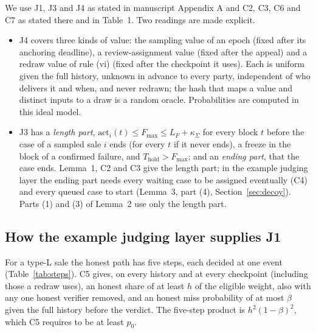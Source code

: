 \documentclass[10pt,a4paper]{article}
\newcommand{\Thold}{T_{\mathrm{hold}}}
\newcommand{\Fmax}{F_{\max}}
\newcommand{\kS}{\kappa_{\Sigma}}
\theoremstyle{plain}
\theoremstyle{remark}
\begin{document}
We use J1, J3 and J4 as stated in manuscript Appendix A and C2, C3, C6 and C7 as stated there and in Table~1. Two readings are made explicit.
\begin{itemize}
\item J4 covers three kinds of value: the sampling value of an epoch (fixed after its anchoring deadline), a review-assignment value (fixed after the appeal) and a redraw value of rule (vi) (fixed after the checkpoint it uses). Each is uniform given the full history, unknown in advance to every party, independent of who delivers it and when, and never redrawn; the hash that maps a value and distinct inputs to a draw is a random oracle. Probabilities are computed in this ideal model.
\item J3 has a \emph{length part}, $\mathrm{act}_i(t)\le\Fmax\le L_F+\kS$ for every block $t$ before the case of a sampled sale $i$ ends (for every $t$ if it never ends), a freeze in the block of a confirmed failure, and $\Thold>\Fmax$; and an \emph{ending part}, that the case ends. Lemma~1, C2 and C3 give the length part; in the example judging layer the ending part needs every waiting case to be assigned eventually (C4) and every queued case to start (Lemma~3, part (4), Section~\ref{sec:decoy}). Parts (1) and (3) of Lemma~2 use only the length part.
\end{itemize}

\subsection{How the example judging layer supplies J1}
\label{sec:honestpath}

For a type-L sale the honest path has five steps, each decided at one event (Table~\ref{tab:steps}). C5 gives, on every history and at every checkpoint (including those a redraw uses), an honest share of at least $h$ of the eligible weight, also with any one honest verifier removed, and an honest miss probability of at most $\beta$ given the full history before the verdict. The five-step product is $h^2(1-\beta)^2$, which C5 requires to be at least $p_0$.
\end{document}
